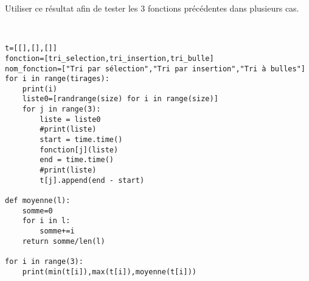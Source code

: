 \begin{exercice}
Utiliser ce résultat afin de tester les 3 fonctions précédentes dans plusieurs cas.
\end{exercice}        

\begin{solution}~\\
\vspace{-0.7cm}
\begin{verbatim}
t=[[],[],[]]
fonction=[tri_selection,tri_insertion,tri_bulle]
nom_fonction=["Tri par sélection","Tri par insertion","Tri à bulles"]
for i in range(tirages):
    print(i)
    liste0=[randrange(size) for i in range(size)]
    for j in range(3):
        liste = liste0
        #print(liste)
        start = time.time()
        fonction[j](liste) 
        end = time.time()
        #print(liste)
        t[j].append(end - start)
        
def moyenne(l):
    somme=0
    for i in l:
        somme+=i
    return somme/len(l)

for i in range(3):
    print(min(t[i]),max(t[i]),moyenne(t[i]))
\end{verbatim}    
\end{solution}





















